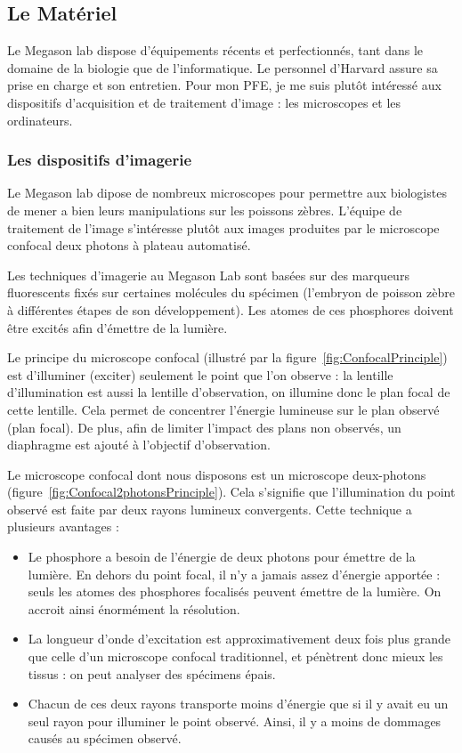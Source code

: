 \subsection{Le Matériel} 
Le Megason lab dispose d'équipements récents et perfectionnés, tant dans le domaine de la biologie que de l'informatique. Le personnel d'Harvard assure sa prise en charge et son entretien.
Pour mon PFE, je me suis plutôt intéressé aux dispositifs d'acquisition et de traitement d'image : les microscopes et les ordinateurs.

\subsubsection{Les dispositifs d'imagerie}


Le Megason lab dipose de nombreux microscopes pour permettre aux biologistes de mener a bien leurs manipulations sur les poissons zèbres.
L'équipe de traitement de l'image s'intéresse plutôt aux images produites par le microscope confocal deux photons à plateau automatisé. 

Les techniques d'imagerie au Megason Lab sont basées sur des marqueurs fluorescents fixés sur certaines molécules du spécimen (l'embryon de poisson zèbre à différentes étapes de son développement). Les atomes de ces phosphores doivent être excités afin d'émettre de la lumière.


Le principe du microscope confocal (illustré par la figure~\ref{fig:ConfocalPrinciple}) est d'illuminer (exciter) seulement le point que l'on observe : la lentille d'illumination est aussi la lentille d'observation, on illumine donc le plan focal de cette lentille. Cela permet de concentrer l'énergie lumineuse sur le plan observé (plan focal). De plus, afin de limiter l'impact des plans non observés, un diaphragme est ajouté à l'objectif d'observation.

Le microscope confocal dont nous disposons est un microscope deux-photons (figure~\ref{fig:Confocal2photonsPrinciple}).
Cela s'signifie que l'illumination du point observé est faite par deux rayons lumineux convergents.
Cette technique a plusieurs avantages :
\begin{itemize}
  \item Le phosphore a besoin de l'énergie de deux photons pour émettre de la lumière. En dehors du point focal, il n'y a jamais assez d'énergie apportée : seuls les atomes des phosphores focalisés peuvent émettre de la lumière. On accroit ainsi énormément la résolution.
  \item La longueur d'onde d'excitation est approximativement deux fois plus grande que celle d'un microscope confocal traditionnel, et pénètrent donc mieux les tissus : on peut analyser des spécimens épais.
  \item Chacun de ces deux rayons transporte moins d'énergie que si il y avait eu un seul rayon pour illuminer le point observé.
  Ainsi, il y a moins de dommages causés au spécimen observé.
\end{itemize}

